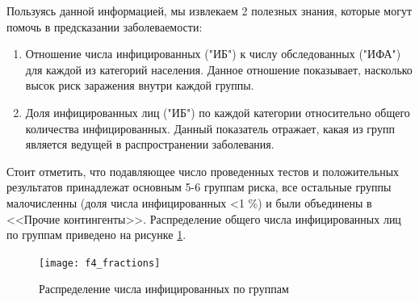 \begin{table}[h]
	\caption{Фрагмент таблицы ВИЧ-контингентов}
	\label{tab:f4_table}
\end{table}

Пользуясь данной информацией, мы извлекаем 2 полезных знания, которые могут помочь в предсказании заболеваемости:
\begin{enumerate}
	\item Отношение числа инфицированных ("ИБ") к числу обследованных ("ИФА") для каждой из категорий населения. Данное отношение показывает, насколько высок риск заражения внутри каждой группы. 
	
	\item Доля инфицированных лиц ("ИБ") по каждой категории относительно общего количества инфицированных. Данный показатель отражает, какая из групп является ведущей в распространении заболевания.
\end{enumerate}


Стоит отметить, что подавляющее число проведенных тестов и положительных результатов принадлежат основным 5-6 группам риска, все остальные группы малочисленны (доля числа инфицированных <1 \%) и были объединены в <<Прочие контингенты>>. Распределение общего числа инфицированных лиц по группам приведено на рисунке \ref{fig:f4_fractions}.

\newpage
\begin{figure}[ht]
	\centering
	\texttt{[image: f4\_fractions]}
	\caption{Распределение числа инфицированных по группам}
	\label{fig:f4_fractions}
\end{figure}

